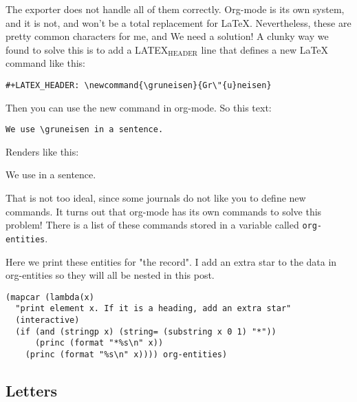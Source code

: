\documentclass[11pt]{article}
\begin{document}
The exporter does not handle all of them correctly. Org-mode is its own system, and it is not, and won't be a total replacement for \LaTeX{}. Nevertheless, these are pretty common characters for me, and We need a solution! A clunky way we found to solve this is to add a LATEX$_{\text{HEADER}}$ line that defines a new \LaTeX{} command like this:

\begin{verbatim}
#+LATEX_HEADER: \newcommand{\gruneisen}{Gr\"{u}neisen}
\end{verbatim}

Then you can use the new command in org-mode. So this text:
\begin{verbatim}
We use \gruneisen in a sentence.
\end{verbatim}

Renders like this:

We use \gruneisen in a sentence.

That is not too ideal, since some journals do not like you to define new commands. It turns out that org-mode has its own commands to solve this problem! There is a list of these commands stored in a variable called \texttt{org-entities}.

Here we print these entities for "the record". I add an extra star to the data in org-entities so they will all be nested in this post.

\begin{verbatim}
(mapcar (lambda(x)
  "print element x. If it is a heading, add an extra star"
  (interactive)
  (if (and (stringp x) (string= (substring x 0 1) "*"))
      (princ (format "*%s\n" x))
    (princ (format "%s\n" x)))) org-entities)
\end{verbatim}
\subsection{Letters}
\label{sec-1-1}
\end{document}
